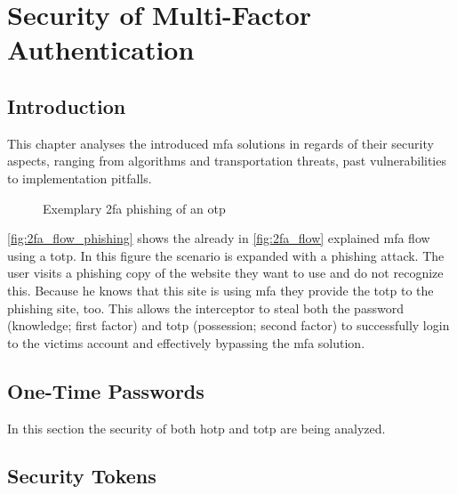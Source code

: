 \chapter{Security of Multi-Factor Authentication}

\section{Introduction}

This chapter analyses the introduced \gls{mfa} solutions in regards of their security aspects, ranging from algorithms and transportation threats, past vulnerabilities to implementation pitfalls.

\begin{figure}[hbt]
	\centering
	
	\caption[Exemplary \gls{mfa} phishing of an \gls{otp}]{Exemplary \gls{2fa} phishing of an \gls{otp}\footnotemark}
	\label{fig:2fa_flow_phishing}
\end{figure}

\autoref{fig:2fa_flow_phishing} shows the already in \autoref{fig:2fa_flow} explained \gls{mfa} flow using a \gls{totp}. In this figure the scenario is expanded with a phishing attack. The user visits a phishing copy of the website they want to use and do not recognize this. Because he knows that this site is using \gls{mfa} they provide the \gls{totp} to the phishing site, too. This allows the interceptor to steal both the password (knowledge; first factor) and \gls{totp} (possession; second factor) to successfully login to the victims account and effectively bypassing the \gls{mfa} solution.

\section{One-Time Passwords}
\label{sec:totp_sec}

In this section the security of both \gls{hotp} and \gls{totp} are being analyzed.



\section{Security Tokens}
\label{sec:tokens}


